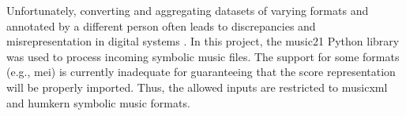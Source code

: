 

Unfortunately, converting and aggregating datasets of varying
formats and annotated by a different person often leads to
discrepancies and misrepresentation in digital systems
\parencite{napoleslopez2018encoding,
napoleslopez2019effects}. In this project, the music21
Python library \parencite{cuthbert2010music21} was used to
process incoming symbolic music files. The support for some
formats (e.g., \gls{mei}) is currently inadequate for
guaranteeing that the score representation will be properly
imported. Thus, the allowed inputs are restricted to
\gls{musicxml} and \gls{humkern} symbolic music formats.
